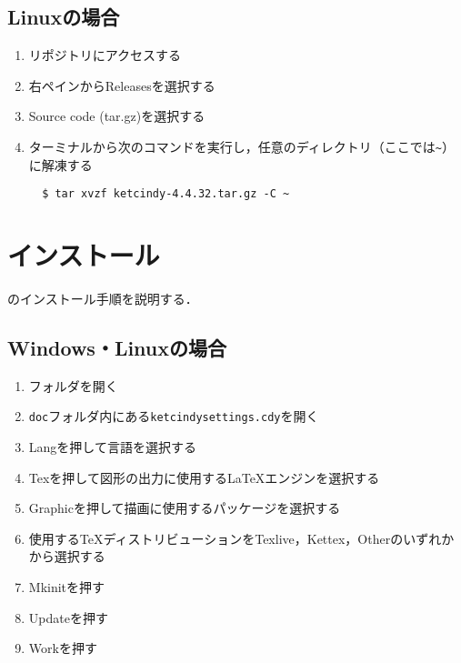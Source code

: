 \newpage

\subsection{Linuxの場合}
\begin{enumerate}
    \item リポジトリにアクセスする
    \item 右ペインからReleasesを選択する
    \item Source code (tar.gz)を選択する
    \item ターミナルから次のコマンドを実行し，任意のディレクトリ（ここでは\verb|~|）に解凍する
    \begin{lstlisting}
  $ tar xvzf ketcindy-4.4.32.tar.gz -C ~
    \end{lstlisting}
\end{enumerate}

\section{インストール}

{\ketcindy}のインストール手順を説明する．

\subsection{Windows・Linuxの場合}
\begin{enumerate}
    \item {\ketcindy}フォルダを開く
    \item \verb|doc|フォルダ内にある\verb|ketcindysettings.cdy|を開く
    \item Langを押して言語を選択する
    \item Texを押して図形の出力に使用する{\LaTeX}エンジンを選択する
    \item Graphicを押して描画に使用するパッケージを選択する
    \item 使用する{\TeX}ディストリビューションをTexlive，Kettex，Otherのいずれかから選択する
    \item Mkinitを押す
    \item Updateを押す
    \item Workを押す
\end{enumerate}


